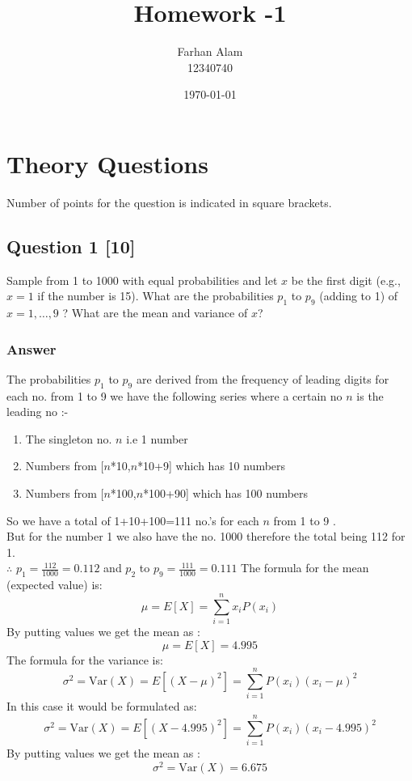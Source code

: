 \documentclass[12pt]{article}
\title{Homework -1 }
\author{Farhan Alam \\
12340740}
\date{\today}  %
\begin{document}
\maketitle
\thispagestyle{empty}  %



\section{Theory Questions}
Number of points for the question is indicated in square brackets.

\subsection*{Question 1 [10] }

Sample from 1 to 1000 with equal probabilities and let \( x \) be the first digit (e.g., \( x = 1 \) if the number is 15). What are the probabilities \( p_1 \) to \( p_9 \) (adding to 1) of \( x = 1, \dots, 9 \) ? What are the mean and variance of \( x \)?
\subsubsection*{Answer}

   The probabilities \( p_1 \) to \( p_9 \) are derived from the frequency of leading digits for  each no. from 1 to 9 we have the following series where a certain no \(n\) is the leading no :-
  \begin{enumerate}
    \item The singleton no. \(n\) i.e 1 number
    \item Numbers from [\(n\)*10,\(n\)*10+9] which has 10 numbers
    \item Numbers from [\(n\)*100,\(n\)*100+90] which has 100 numbers
\end{enumerate}
So we have a total of 1+10+100=111 no.'s for each \(n\) from 1 to 9  .\\But for the number 1 we also have the no. 1000 therefore the total being 112 for 1.\\
\(\therefore\) \( p_1 = \frac{112}{1000} = 0.112 \) and 
\( p_2 \) to \( p_9 = \frac{111}{1000} = 0.111 \)
The formula for the mean (expected value) is:
\[
\mu = E[X] = \sum_{i=1}^n x_i P(x_i)
\]
By putting values we get the mean as : \[
\mu = E[X] = 4.995
\]
The formula for the variance is:
\[
\sigma^2 = \text{Var}(X) = E[(X - \mu)^2] = \sum_{i=1}^n P(x_i) (x_i - \mu)^2
\]
In this case it would be formulated as:
\[
\sigma^2 = \text{Var}(X) = E[(X - 4.995)^2] = \sum_{i=1}^n P(x_i) (x_i - 4.995)^2
\]
By putting values we get the mean as : \[
\sigma^2 =\text{Var}(X)= 6.675
\]
\end{document}
